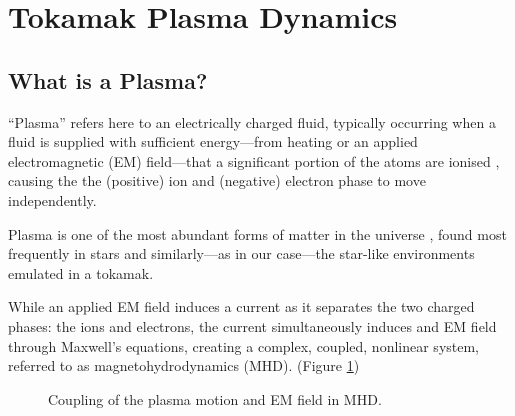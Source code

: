 \section{Tokamak  Plasma Dynamics}
    \subsection{What is a Plasma?}
        \begin{definition}[Plasma]
            ``Plasma'' refers here to an electrically charged fluid, typically occurring when a fluid is supplied with sufficient energy—from heating or an applied electromagnetic (EM) field—that a significant portion of the atoms  are ionised , causing the the (positive) ion and (negative) electron phase to move independently.
        \end{definition}
        
        Plasma is one of the most abundant forms of matter in the universe \cite{CL13}, found most frequently in stars \cite{Phi95, Asc06, Pie17} and similarly—as in our case—the star-like environments emulated in a tokamak.
        
        While an applied EM field induces a current as it separates the two charged phases: the ions and electrons, the current simultaneously induces and EM field through Maxwell's equations, creating a complex, coupled, nonlinear system, referred to as magnetohydrodynamics (MHD). (Figure \ref{MHD coupling}) \BA{[Ref.]}
        
        \begin{figure}[!h]
            \centering
            \caption{Coupling of the plasma motion and EM field in MHD.}
            \label{MHD coupling}
        \end{figure}
    
